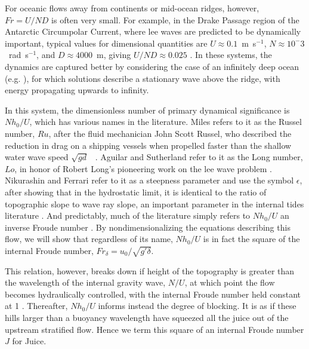 \documentclass[12pt]{article}
\begin{document}
	For oceanic flows away from continents or mid-ocean ridges, however, $Fr=U/ND$ is often very small. For example, in the Drake Passage region of the Antarctic Circumpolar Current, where lee waves are predicted to be dynamically important, typical values for dimensional quantities are $U \approx 0.1$~m~s$^{-1}$, $N \approx 10^-3$~rad~s$^{-1}$, and $D \approx 4000$~m, giving $U/ND \approx 0.025$ \citep{Nikurashin2010a}. In these systems, the dynamics are captured better by considering the case of an infinitely deep ocean (e.g. \cite{Long1953}), for which solutions describe a stationary wave above the ridge, with energy propagating upwards to infinity. 
	
	In this system, the dimensionless number of primary dynamical significance is $Nh_0/U$, which has various names in the literature. Miles refers to it as the Russel number, $Ru$, after the fluid mechanician John Scott Russel, who described the reduction in drag on a shipping vessels when propelled faster than the shallow water wave speed $\sqrt{gd}$ ~\citep{Miles1969}.
	 Aguilar and Sutherland refer to it as the Long number, $Lo$, in honor of Robert Long's pioneering work on the lee wave problem \citep{Aguilar2006a,Long1953}. Nikurashin and Ferrari refer to it as a steepness parameter and use the symbol $\epsilon$, after showing that in the hydrostatic limit, it is identical to the ratio of topographic slope to wave ray slope, an important parameter in the internal tides literature \citep{Nikurashin2010a}. And predictably, much of the literature simply refers to $Nh_0/U$ an inverse Froude number \citep{Laprise1989,Legg2008a,Klymak2010,Eckermann2010,Winters2012}. By nondimensionalizing the equations describing this flow, we will show that regardless of its name,  $Nh_0/U$ is in fact the square of the internal Froude number, $Fr_{\delta}=u_0/\sqrt{g'\delta}$. 
	
	This relation, however, breaks down if height of the topography is greater than the wavelength of the internal gravity wave, $N/U$, at which point the flow becomes hydraulically controlled, with the internal Froude number held constant at 1 \citep{Winters2012}. Thereafter, $Nh_0/U$ informs instead the degree of blocking. It is as if these hills larger than a buoyancy wavelength have squeezed all the juice out of the upstream stratified flow. Hence we term this square of an internal Froude number $J$ for Juice. 
	
\end{document}
